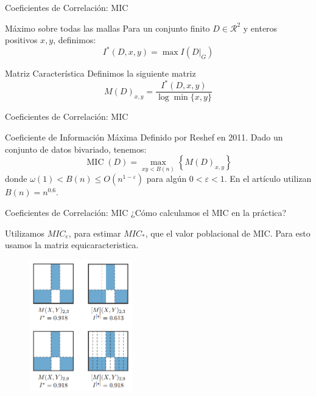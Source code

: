 \documentclass{beamer}
\begin{document}
\begin{frame}{Coeficientes de Correlación: MIC}
    \begin{block}{Máximo sobre todas las mallas}
        Para un conjunto finito $D\in\mathcal{R}  ^2$ y enteros positivos $x,y$, definimos:
        $$
        I^*(D,x,y)=\max I(D|_G)
        $$
    \end{block}
    \begin{block}{Matriz Característica}
        Definimos la siguiente matriz       
        \begin{equation*}
	    	M(D)_{x, y}=\frac{I^{*}(D, x, y)}{\log \min \{x, y\}}
        \end{equation*}
    \end{block}
\end{frame}

\begin{frame}{Coeficientes de Correlación: MIC}
     
    \begin{block}{Coeficiente de Información Máxima}
        Definido por Reshef en 2011. Dado un conjunto de datos bivariado, tenemos:
        \begin{equation*}
	    	\operatorname{MIC}(D)=\max _{x y<B(n)}\left\{M(D)_{x, y}\right\}
        \end{equation*}
        donde $\omega(1)<B(n) \leq O\left(n^{1-\varepsilon}\right)$ para alg\'un $0<\varepsilon<1$. En el artículo utilizan $B(n)=n^{0.6}$.
    \end{block}
\end{frame}


\begin{frame}{Coeficientes de Correlación: MIC}
    ¿Cómo calculamos el MIC en la práctica?
    \pause

    Utilizamos $MIC_{e}$, para estimar $MIC_*$, que el valor poblacional de MIC.
    \pause 
    Para esto usamos la matriz equicaracteristica.
    
    \begin{figure}
        \centering
        \includegraphics[width=0.4\textwidth]{figuras/figure_1_reshef_2016.png}
    \end{figure}
\end{frame}
\end{document}
